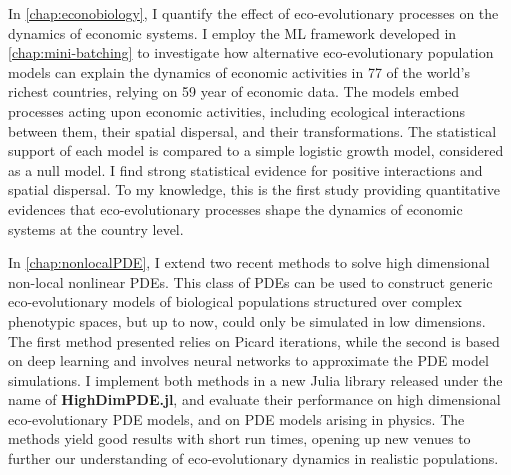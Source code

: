 In \cref{chap:econobiology}, I quantify the effect of eco-evolutionary processes on the dynamics of economic systems. I employ the ML framework developed in \cref{chap:mini-batching} to investigate how alternative eco-evolutionary population models can explain the dynamics of economic activities in 77 of the world's richest countries, relying on 59 year of economic data. The models embed processes acting upon economic activities, including ecological interactions between them, their spatial dispersal, and their transformations. The statistical support of each model is compared to a simple logistic growth model, considered as a null model. I find strong statistical evidence for positive interactions and spatial dispersal. To my knowledge, this is the first study providing quantitative evidences that eco-evolutionary processes shape the dynamics of economic systems at the country level.

In \cref{chap:nonlocalPDE}, I extend two recent methods to solve high dimensional non-local nonlinear PDEs. This class of PDEs can be used to construct generic eco-evolutionary models of biological populations structured over complex phenotypic spaces, but up to now, could only be simulated in low dimensions. The first method presented relies on Picard iterations, while the second is based on deep learning and involves neural networks to approximate the PDE model simulations. I implement both methods in a new Julia library released under the name of \textbf{HighDimPDE.jl}, and evaluate their performance on high dimensional eco-evolutionary PDE models, and on PDE models arising in physics. The methods yield good results with short run times, opening up new venues to further our understanding of eco-evolutionary dynamics in realistic populations.

\newpage
